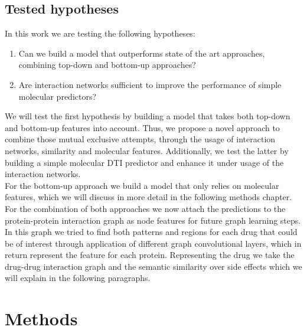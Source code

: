 \documentclass{bioinfo}
\begin{document}
\subsection{Tested hypotheses}

In this work we are testing the following hypotheses:
\begin{enumerate}
	\item Can we build a model that outperforms state of the art approaches, combining top-down and bottom-up approaches?
	\item Are interaction networks sufficient to improve the performance of simple molecular predictors?
\end{enumerate}
We will test the first hypothesis by building a model that takes both top-down and bottom-up features into account. Thus, we propose a novel approach to combine those mutual exclusive attempts, through the usage of interaction networks, similarity and molecular features. Additionally, we test the latter by building a simple molecular DTI predictor and enhance it under usage of the interaction networks.\\

For the bottom-up approach we build a model that only relies on molecular features, which we will discuss in more detail in the following methods chapter. For the combination of both approaches we now attach the predictions to the protein-protein interaction graph as node features for future graph learning steps. In this graph we tried to find both patterns and regions for each drug that could be of interest through application of different graph convolutional layers, which in return represent the feature for each protein. Representing the drug we take the drug-drug interaction graph and the semantic similarity over side effects which we will explain in the following paragraphs.

\section{Methods}
\end{document}
